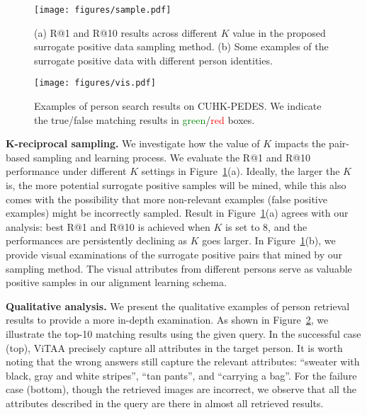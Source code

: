 \documentclass[runningheads]{llncs}
\begin{document}
\begin{figure}[t]
\centering
\texttt{[image: figures/sample.pdf]}
\caption{(a) R@1 and R@10 results across different $K$ value in the proposed surrogate positive data sampling method. (b) Some examples of the surrogate positive data with different person identities.}
\label{fig:sample}
\end{figure}

\begin{figure}[t]
\centering
\texttt{[image: figures/vis.pdf]}
\caption{Examples of person search results on CUHK-PEDES. We indicate the true/false matching results in \textcolor{green}{green}/\textcolor{red}{red} boxes.}
\label{fig:visana}
\end{figure}

\noindent\textbf{K-reciprocal sampling.}
We investigate how the value of $K$ impacts the pair-based sampling and learning process. We evaluate the R@1 and R@10 performance under different $K$ settings in Figure~\ref{fig:sample}(a). Ideally, the larger the $K$ is, the more potential surrogate positive samples will be mined, while this also comes with the possibility that more non-relevant examples (false positive examples) might be incorrectly sampled. Result in Figure~\ref{fig:sample}(a) agrees with our analysis: best R@1 and R@10 is achieved when $K$ is set to 8, and the performances are persistently declining as $K$ goes larger. In Figure~\ref{fig:sample}(b), we provide visual examinations of the surrogate positive pairs that mined by our sampling method. The visual attributes from different persons serve as valuable positive samples in our alignment learning schema.

\noindent\textbf{Qualitative analysis.}
We present the qualitative examples of person retrieval results to provide a more in-depth examination. As shown in Figure~\ref{fig:visana}, we illustrate the top-10 matching results using the given query. 
In the successful case (top), ViTAA precisely capture all attributes in the target person. It is worth noting that the wrong answers still capture the relevant attributes: ``sweater with black, gray and white stripes'', ``tan pants'', and ``carrying a bag''.
For the failure case (bottom), though the retrieved images are incorrect, we observe that all the attributes described in the query are there in almost all retrieved results.
\end{document}
